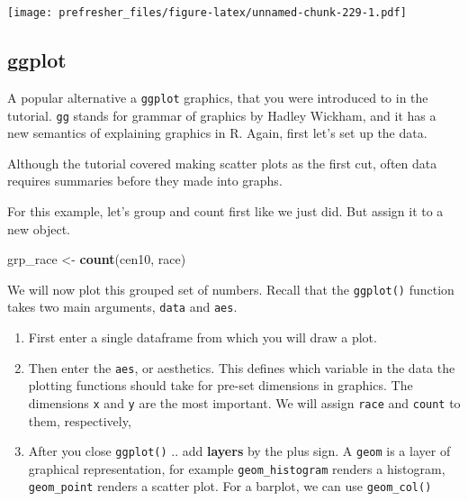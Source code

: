 \documentclass[
]{book}
\newenvironment{Shaded}{\begin{snugshade}}{\end{snugshade}}
\newcommand{\KeywordTok}[1]{\textcolor[rgb]{0.13,0.29,0.53}{\textbf{#1}}}
\newcommand{\NormalTok}[1]{#1}
\newcommand{\OperatorTok}[1]{\textcolor[rgb]{0.81,0.36,0.00}{\textbf{#1}}}
\newcommand{\StringTok}[1]{\textcolor[rgb]{0.31,0.60,0.02}{#1}}
\providecommand{\tightlist}{%
  \setlength{\itemsep}{0pt}\setlength{\parskip}{0pt}}
\theoremstyle{definition}
\theoremstyle{definition}
\theoremstyle{definition}
\theoremstyle{remark}
\begin{document}
\begin{Shaded}
\end{Shaded}

\texttt{[image: prefresher\_files/figure-latex/unnamed-chunk-229-1.pdf]}

\hypertarget{ggplot}{%
\subsection{ggplot}\label{ggplot}}

A popular alternative a \texttt{ggplot} graphics, that you were introduced to in the tutorial. \texttt{gg} stands for grammar of graphics by Hadley Wickham, and it has a new semantics of explaining graphics in R. Again, first let's set up the data.

Although the tutorial covered making scatter plots as the first cut, often data requires summaries before they made into graphs.

For this example, let's group and count first like we just did. But assign it to a new object.

\begin{Shaded}
\begin{Highlighting}[]
\NormalTok{grp\_race <{-}}\StringTok{ }\KeywordTok{count}\NormalTok{(cen10, race)}
\end{Highlighting}
\end{Shaded}

We will now plot this grouped set of numbers. Recall that the \texttt{ggplot()} function takes two main arguments, \texttt{data} and \texttt{aes}.

\begin{enumerate}
\def\labelenumi{\arabic{enumi}.}
\tightlist
\item
  First enter a single dataframe from which you will draw a plot.
\item
  Then enter the \texttt{aes}, or aesthetics. This defines which variable in the data the plotting functions should take for pre-set dimensions in graphics. The dimensions \texttt{x} and \texttt{y} are the most important. We will assign \texttt{race} and \texttt{count} to them, respectively,
\item
  After you close \texttt{ggplot()} .. add \textbf{layers} by the plus sign. A \texttt{geom} is a layer of graphical representation, for example \texttt{geom\_histogram} renders a histogram, \texttt{geom\_point} renders a scatter plot. For a barplot, we can use \texttt{geom\_col()}
\end{enumerate}
\end{document}
